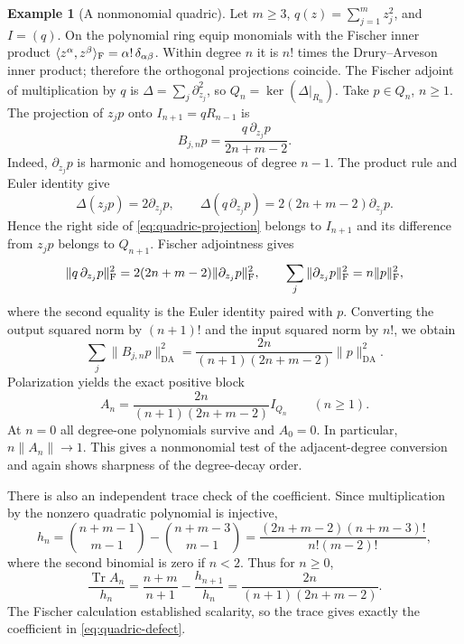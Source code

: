 \documentclass[11pt,reqno]{amsart}
\numberwithin{equation}{section}
\theoremstyle{definition}
\newtheorem{example}[theorem]{Example}
\theoremstyle{remark}
\newcommand{\DA}{\mathrm{DA}}
\DeclareMathOperator{\Tr}{Tr}
\begin{document}
\begin{example}[A nonmonomial quadric]\label{ext:quadric-defect}
Let $m\geq3$, $q(z)=\sum_{j=1}^m z_j^2$, and $I=(q)$. On the
polynomial ring equip monomials with the Fischer inner product
$\langle z^\alpha,z^\beta\rangle_{\rm F}=\alpha!\,\delta_{\alpha\beta}$.
Within degree $n$ it is $n!$ times the Drury--Arveson inner product;
therefore the orthogonal projections coincide. The Fischer adjoint of
multiplication by $q$ is $\Delta=\sum_j\partial_{z_j}^2$, so
$Q_n=\ker(\Delta|_{R_n})$. Take $p\in Q_n$, $n\geq1$. The projection
of $z_jp$ onto $I_{n+1}=qR_{n-1}$ is
\begin{equation}\label{eq:quadric-projection}
 B_{j,n}p=\frac{q\,\partial_{z_j}p}{2n+m-2}.
\end{equation}
Indeed, $\partial_{z_j}p$ is harmonic and homogeneous of degree $n-1$.
The product rule and Euler identity give
\[
 \Delta(z_jp)=2\partial_{z_j}p,\qquad
 \Delta(q\,\partial_{z_j}p)=2(2n+m-2)\partial_{z_j}p.
\]
Hence the right side of \eqref{eq:quadric-projection} belongs to
$I_{n+1}$ and its difference from $z_jp$ belongs to $Q_{n+1}$.
Fischer adjointness gives
\[
 \|q\,\partial_{z_j}p\|_{\rm F}^2
   =2(2n+m-2)\|\partial_{z_j}p\|_{\rm F}^2,
 \qquad
 \sum_j\|\partial_{z_j}p\|_{\rm F}^2=n\|p\|_{\rm F}^2,
\]
where the second equality is the Euler identity paired with $p$.
Converting the output squared norm by $(n+1)!$ and the input squared
norm by $n!$, we obtain
\[
 \sum_j\|B_{j,n}p\|_{\DA}^2
   =\frac{2n}{(n+1)(2n+m-2)}\|p\|_{\DA}^2.
\]
Polarization yields the exact positive block
\begin{equation}\label{eq:quadric-defect}
 A_n=\frac{2n}{(n+1)(2n+m-2)}I_{Q_n}\qquad(n\geq1).
\end{equation}
At $n=0$ all degree-one polynomials survive and $A_0=0$. In particular,
$n\|A_n\|\to1$. This gives a nonmonomial test of the adjacent-degree
conversion and again shows sharpness of the degree-decay order.

There is also an independent trace check of the coefficient. Since
multiplication by the nonzero quadratic polynomial is injective,
\[
 h_n=\binom{n+m-1}{m-1}-\binom{n+m-3}{m-1}
 =\frac{(2n+m-2)(n+m-3)!}{n!(m-2)!},
\]
where the second binomial is zero if $n<2$. Thus for $n\geq0$,
\[
 \frac{\Tr A_n}{h_n}
 =\frac{n+m}{n+1}-\frac{h_{n+1}}{h_n}
 =\frac{2n}{(n+1)(2n+m-2)}.
\]
The Fischer calculation established scalarity, so the trace gives
exactly the coefficient in \eqref{eq:quadric-defect}.
\end{example}
\end{document}
